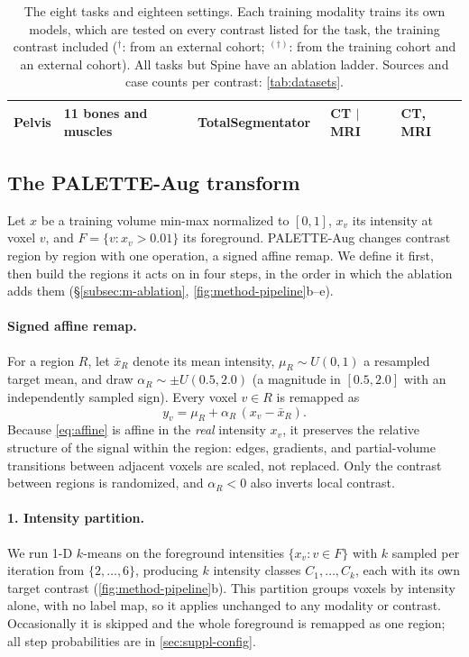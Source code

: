 \begin{table}[t]
\begin{tabular}{@{}l P{2.5cm} P{4.4cm} l P{4.1cm}@{}}
Pelvis   & 11 bones and muscles    & TotalSegmentator~\cite{wasserthal2023totalseg,dantonoli2025totalsegmri} & CT $\mid$ MRI & CT, MRI \\
\bottomrule
\end{tabular}
\caption{The eight tasks and eighteen settings. Each training modality trains
its own models, which are tested on every contrast listed for the task, the
training contrast included ($^\dagger$: from an external cohort;
$^{(\dagger)}$: from the training cohort and an external cohort). All tasks
but Spine have an ablation ladder. Sources and case counts per contrast:
\cref{tab:datasets}.}
\label{tab:tasks}
\end{table}


\subsection{The PALETTE-Aug transform}
\label{subsec:m-transform}

Let $x$ be a training volume min-max normalized to $[0,1]$, $x_v$ its
intensity at voxel $v$, and $F = \{v : x_v > 0.01\}$ its foreground.
PALETTE-Aug changes contrast region by region with one operation, a signed
affine remap. We define it first, then build the regions it acts on in four
steps, in the order in which the ablation adds them
(\S\ref{subsec:m-ablation}, \cref{fig:method-pipeline}b--e).

\paragraph{Signed affine remap.} For a region $R$, let $\bar{x}_R$ denote its
mean intensity, $\mu_R \sim U(0,1)$ a resampled target mean, and draw
$\alpha_R \sim \pm U(0.5, 2.0)$ (a magnitude in $[0.5, 2.0]$ with an
independently sampled sign). Every voxel $v \in R$ is remapped as
\begin{equation}
  y_v = \mu_R + \alpha_R \, (x_v - \bar{x}_R).
  \label{eq:affine}
\end{equation}
Because \cref{eq:affine} is affine in the \emph{real} intensity $x_v$, it
preserves the relative structure of the signal within the region: edges,
gradients, and partial-volume transitions between adjacent voxels are scaled,
not replaced. Only the contrast between regions is randomized, and
$\alpha_R < 0$ also inverts local contrast.

\paragraph{1. Intensity partition.} We run 1-D $k$-means on the foreground
intensities $\{x_v : v \in F\}$ with $k$ sampled per iteration from
$\{2,\dots,6\}$, producing $k$ intensity classes $C_1, \dots, C_k$, each
with its own target contrast (\cref{fig:method-pipeline}b). This partition
groups voxels by intensity alone, with no label map, so it applies unchanged
to any modality or contrast. Occasionally it is skipped and the whole
foreground is remapped as one region; all step probabilities are in
\cref{sec:suppl-config}.

